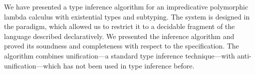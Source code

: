 We have presented a type inference algorithm for an impredicative polymorphic
lambda calculus with existential types and subtyping. The system is designed in
the \CBPV paradigm, which allowed us to restrict it to a decidable fragment of the
language described declaratively. We presented the inference algorithm
and proved its soundness and completeness with respect to the specification. The
algorithm combines unification---a standard type inference technique---with
anti-unification---which has not been used in type inference before.
